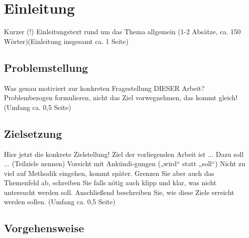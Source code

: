 \section{Einleitung}
Kurzer (!) Einleitungstext rund um das Thema allgemein (1-2 Absätze, ca. 150 Wörter)(Einleitung insgesamt ca. 1 Seite)

\subsection{Problemstellung}
Was genau motiviert zur konkreten Fragestellung DIESER Arbeit? Problembezogen formulieren, nicht das Ziel vorwegnehmen, das kommt gleich!(Umfang ca. 0,5 Seite)

\subsection{Zielsetzung}
Hier jetzt die konkrete Zielstellung!
Ziel der vorliegenden Arbeit ist ... Dazu soll ... (Teilziele nennen) Vorsicht mit Ankündi-gungen („wird“ statt „soll“)
Nicht zu viel auf Methodik eingehen, kommt später.
Grenzen Sie aber auch das Themenfeld ab, schreiben Sie falls nötig auch klipp und klar, was nicht untersucht werden soll.
Anschließend beschreiben Sie, wie diese Ziele erreicht werden sollen.
(Umfang ca. 0,5 Seite)

\subsection{Vorgehensweise}